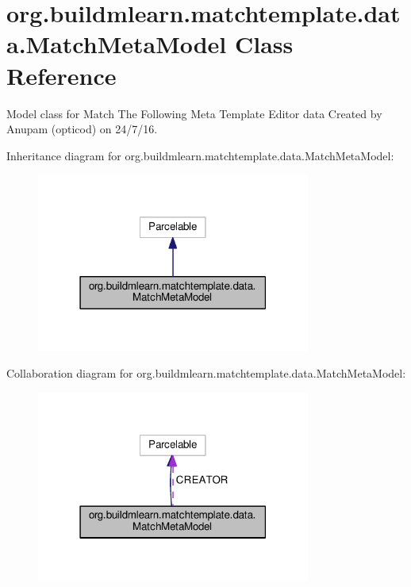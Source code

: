 \hypertarget{classorg_1_1buildmlearn_1_1matchtemplate_1_1data_1_1MatchMetaModel}{}\section{org.\+buildmlearn.\+matchtemplate.\+data.\+Match\+Meta\+Model Class Reference}
\label{classorg_1_1buildmlearn_1_1matchtemplate_1_1data_1_1MatchMetaModel}


Model class for Match The Following Meta Template Editor data Created by Anupam (opticod) on 24/7/16.  




Inheritance diagram for org.\+buildmlearn.\+matchtemplate.\+data.\+Match\+Meta\+Model\+:
\nopagebreak
\begin{figure}[H]
\begin{center}
\leavevmode
\includegraphics[width=255pt]{classorg_1_1buildmlearn_1_1matchtemplate_1_1data_1_1MatchMetaModel__inherit__graph}
\end{center}
\end{figure}


Collaboration diagram for org.\+buildmlearn.\+matchtemplate.\+data.\+Match\+Meta\+Model\+:
\nopagebreak
\begin{figure}[H]
\begin{center}
\leavevmode
\includegraphics[width=255pt]{classorg_1_1buildmlearn_1_1matchtemplate_1_1data_1_1MatchMetaModel__coll__graph}
\end{center}
\end{figure}
